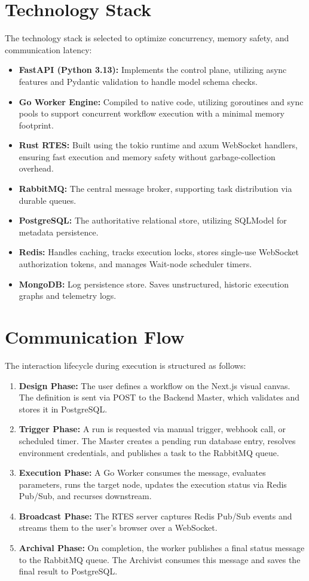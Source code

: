 \documentclass[12pt]{report}
\begin{document}
\section{Technology Stack}
The technology stack is selected to optimize concurrency, memory safety, and communication latency:
\begin{itemize}
    \item \textbf{FastAPI (Python 3.13):} Implements the control plane, utilizing async features and Pydantic validation to handle model schema checks.
    \item \textbf{Go Worker Engine:} Compiled to native code, utilizing goroutines and sync pools to support concurrent workflow execution with a minimal memory footprint.
    \item \textbf{Rust RTES:} Built using the tokio runtime and axum WebSocket handlers, ensuring fast execution and memory safety without garbage-collection overhead.
    \item \textbf{RabbitMQ:} The central message broker, supporting task distribution via durable queues.
    \item \textbf{PostgreSQL:} The authoritative relational store, utilizing SQLModel for metadata persistence.
    \item \textbf{Redis:} Handles caching, tracks execution locks, stores single-use WebSocket authorization tokens, and manages Wait-node scheduler timers.
    \item \textbf{MongoDB:} Log persistence store. Saves unstructured, historic execution graphs and telemetry logs.
\end{itemize}

\section{Communication Flow}
The interaction lifecycle during execution is structured as follows:
\begin{enumerate}
    \item \textbf{Design Phase:} The user defines a workflow on the Next.js visual canvas. The definition is sent via POST to the Backend Master, which validates and stores it in PostgreSQL.
    \item \textbf{Trigger Phase:} A run is requested via manual trigger, webhook call, or scheduled timer. The Master creates a pending run database entry, resolves environment credentials, and publishes a task to the RabbitMQ  queue.
    \item \textbf{Execution Phase:} A Go Worker consumes the message, evaluates parameters, runs the target node, updates the execution status via Redis Pub/Sub, and recurses downstream.
    \item \textbf{Broadcast Phase:} The RTES server captures Redis Pub/Sub events and streams them to the user's browser over a WebSocket.
    \item \textbf{Archival Phase:} On completion, the worker publishes a final status message to the RabbitMQ  queue. The Archivist consumes this message and saves the final result to PostgreSQL.
\end{enumerate}
\end{document}
